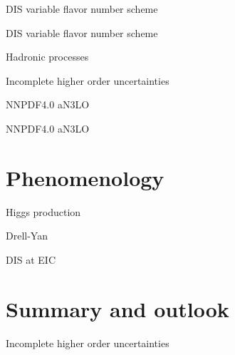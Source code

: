 \documentclass[aspectratio=169, 8pt,t]{beamer}
\begin{document}
\begin{frame}{DIS variable flavor number scheme}
\end{frame}


\begin{frame}{DIS variable flavor number scheme}
\end{frame}

\begin{frame}{Hadronic processes}
\end{frame}


\begin{frame}{Incomplete higher order uncertainties}
%
\end{frame}


\begin{frame}{NNPDF4.0 aN3LO}
\end{frame}

\begin{frame}{NNPDF4.0 aN3LO}
\end{frame}

\section{Phenomenology}

\begin{frame}{Higgs production}

\end{frame}


\begin{frame}{Drell-Yan}

\end{frame}


\begin{frame}{DIS at EIC}

\end{frame}


\section{Summary and outlook}
\begin{frame}{Incomplete higher order uncertainties}
\end{frame}
\end{document}
